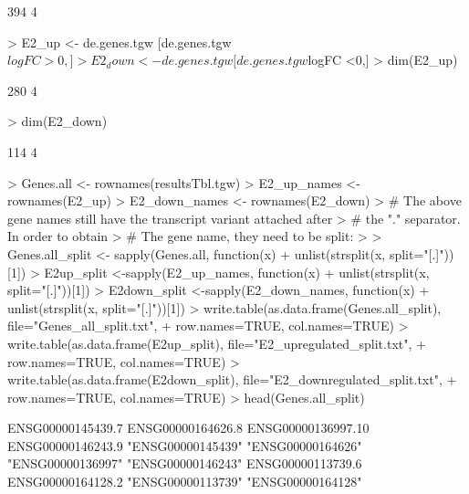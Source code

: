 \documentclass[a4paper,11pt]{article}
\begin{document}
\begin{Schunk}
\begin{Soutput}
[1] 394   4
\end{Soutput}
\begin{Sinput}
> E2_up <- de.genes.tgw [de.genes.tgw $logFC >0,]
> E2_down <- de.genes.tgw [de.genes.tgw $logFC <0,]
> dim(E2_up)
\end{Sinput}
\begin{Soutput}
[1] 280   4
\end{Soutput}
\begin{Sinput}
> dim(E2_down)
\end{Sinput}
\begin{Soutput}
[1] 114   4
\end{Soutput}
\begin{Sinput}
> Genes.all <- rownames(resultsTbl.tgw)
> E2_up_names <- rownames(E2_up)
> E2_down_names <- rownames(E2_down)
> # The above gene names still have the transcript variant attached after
> # the "." separator. In order to obtain
> # The gene name, they need to be split:
> 
> Genes.all_split <- sapply(Genes.all, function(x) 
+   unlist(strsplit(x, split="[.]"))[1])
> E2up_split <-sapply(E2_up_names, function(x) 
+   unlist(strsplit(x, split="[.]"))[1])
> E2down_split <-sapply(E2_down_names, function(x) 
+   unlist(strsplit(x, split="[.]"))[1])
> write.table(as.data.frame(Genes.all_split), file="Genes_all_split.txt",
+             row.names=TRUE, col.names=TRUE)
> write.table(as.data.frame(E2up_split), file="E2_upregulated_split.txt", 
+             row.names=TRUE, col.names=TRUE)
> write.table(as.data.frame(E2down_split), file="E2_downregulated_split.txt", 
+             row.names=TRUE, col.names=TRUE)
> head(Genes.all_split)
\end{Sinput}
\begin{Soutput}
 ENSG00000145439.7  ENSG00000164626.8 ENSG00000136997.10  ENSG00000146243.9 
 "ENSG00000145439"  "ENSG00000164626"  "ENSG00000136997"  "ENSG00000146243" 
 ENSG00000113739.6  ENSG00000164128.2 
 "ENSG00000113739"  "ENSG00000164128" 
\end{Soutput}
\end{Schunk}
\end{document}
